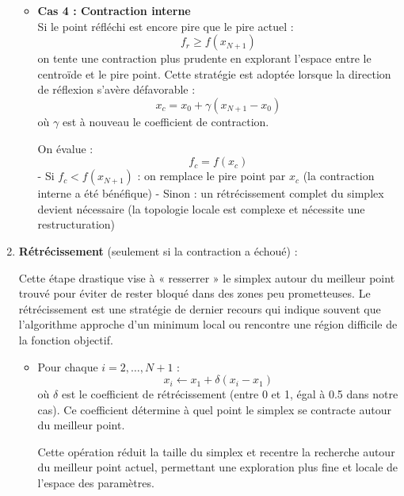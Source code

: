 \begin{enumerate}
\begin{itemize}
\vspace{1em}
    
       \item \textbf{Cas 4 : Contraction interne} \\
       Si le point réfléchi est encore pire que le pire actuel :
       \begin{equation}
       f_r \geq f(x_{N+1})
       \end{equation}
       on tente une contraction plus prudente en explorant l'espace entre le centroïde et le pire point. Cette stratégie est adoptée lorsque la direction de réflexion s'avère défavorable :
       \begin{equation}
       x_c = x_0 + \gamma (x_{N+1} - x_0)
       \end{equation}
       où $\gamma$ est à nouveau le coefficient de contraction.
       
       On évalue :
       \begin{equation}
       f_c = f(x_c)
       \end{equation}
       - Si $f_c < f(x_{N+1})$ : on remplace le pire point par $x_c$ (la contraction interne a été bénéfique)
       - Sinon : un rétrécissement complet du simplex devient nécessaire (la topologie locale est complexe et nécessite une restructuration)
       \end{itemize}

\vspace{1em}

    \item \textbf{Rétrécissement} (seulement si la contraction a échoué) :
    
       Cette étape drastique vise à « resserrer » le simplex autour du meilleur point trouvé pour éviter de rester bloqué dans des zones peu prometteuses. Le rétrécissement est une stratégie de dernier recours qui indique souvent que l'algorithme approche d'un minimum local ou rencontre une région difficile de la fonction objectif.
    
       \begin{itemize}
       \item Pour chaque $i = 2, \ldots, N+1$ :
       \begin{equation}
       x_i \leftarrow x_1 + \delta (x_i - x_1)
       \end{equation}
       où $\delta$ est le coefficient de rétrécissement (entre 0 et 1, égal à 0.5 dans notre cas). Ce coefficient détermine à quel point le simplex se contracte autour du meilleur point.
       
       Cette opération réduit la taille du simplex et recentre la recherche autour du meilleur point actuel, permettant une exploration plus fine et locale de l'espace des paramètres.
       \end{itemize}
    \end{enumerate}
    
